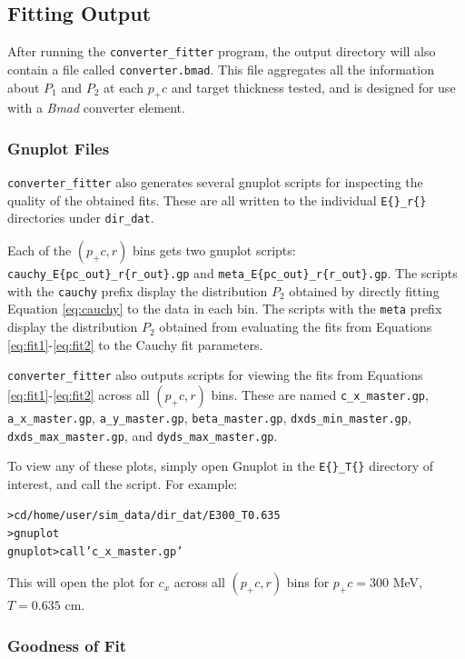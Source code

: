 \documentclass[12pt]{article}
\newcommand{\exef}{\texttt{converter\_fitter}\xspace}
\newcommand{\bmad}{\textit{Bmad}\xspace}
\newenvironment{example}
  {\vspace{-2.5ex} \begin{alltt}}
  {\end{alltt} \vspace{-2.2ex}}
\begin{document}
\subsection{Fitting Output}

After running the \exef program, the output directory will also contain a file called
\texttt{converter.bmad}.  This file aggregates all the information about $P_1$ and $P_2$ at each
$p_+ c$ and target thickness tested, and is designed for use with a \bmad converter element.

\subsubsection{Gnuplot Files}

\exef  also generates several gnuplot scripts for inspecting the quality of the obtained fits.
These are all written to the individual \texttt{E\{\}\_r\{\}} directories under \texttt{dir\_dat}.

Each of the $(p_+ c, r)$ bins gets two gnuplot scripts:
\texttt{cauchy\_E\{pc\_out\}\_r\{r\_out\}.gp} and \texttt{meta\_E\{pc\_out\}\_r\{r\_out\}.gp}.  The
scripts with the \texttt{cauchy} prefix display the distribution $P_2$ obtained by directly fitting
Equation \ref{eq:cauchy} to the data in each bin.  The scripts with the \texttt{meta} prefix display
the distribution $P_2$ obtained from evaluating the fits from Equations \ref{eq:fit1}-\ref{eq:fit2}
to the Cauchy fit parameters.

\exef also outputs scripts for viewing the fits from Equations \ref{eq:fit1}-\ref{eq:fit2} across
all $(p_+ c, r)$ bins.  These are named \texttt{c\_x\_master.gp}, \texttt{a\_x\_master.gp},
\texttt{a\_y\_master.gp}, \texttt{beta\_master.gp}, \texttt{dxds\_min\_master.gp},
\texttt{dxds\_max\_master.gp}, and \texttt{dyds\_max\_master.gp}.

To view any of these plots, simply open Gnuplot in the \texttt{E\{\}\_T\{\}} directory of interest,
and call the script.  For example:
\begin{example}
  > cd /home/user/sim_data/dir_dat/E300_T0.635
  > gnuplot
  gnuplot> call 'c_x_master.gp'
\end{example}
This will open the plot for $c_x$ across all $(p_+ c, r)$ bins for $p_+ c = 300$ MeV, $T = 0.635$ cm.


\subsubsection{Goodness of Fit}
\end{document}
